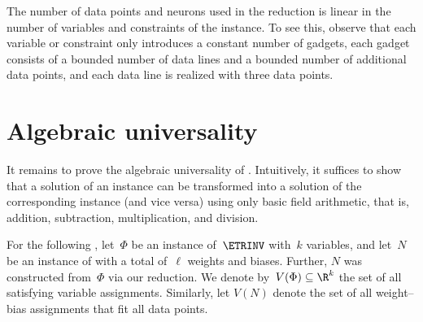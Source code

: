 \documentclass{toc}
\begin{document}

\begin{remark}
    The number of data points and neurons used in the reduction is linear in the number of variables and constraints of the \ETRINV instance.
    To see this, observe that each variable or constraint only introduces a constant number of gadgets, each gadget consists of %
%
a bounded number of %
data lines and %
a bounded number of %
additional data points, and each data line is realized with three data points.
\end{remark}

\section{Algebraic universality}
\label{sec:universality}

It remains to prove the algebraic universality of \trainNN.
Intuitively, it suffices to show that a solution of an \ETRINV instance can be transformed into a solution of the corresponding \trainNN instance (and vice versa) using only basic field arithmetic, that is, addition, subtraction, multiplication, and division.

For the following , let~$\Phi$ be an instance of~$\ETRINV$ with~$k$ variables, and let~$N$ be an instance of \trainNN with a total of~$\ell$ weights and biases.
Further, $N$ was constructed from~$\Phi$ via our reduction.
We denote by~$V(\Phi) \subseteq \R^k$ the set of all satisfying variable assignments.
Similarly, %
%
let $V(N)$ denote the set of all 
%
weight--bias assignments  %
that fit all data points.

\end{document}
